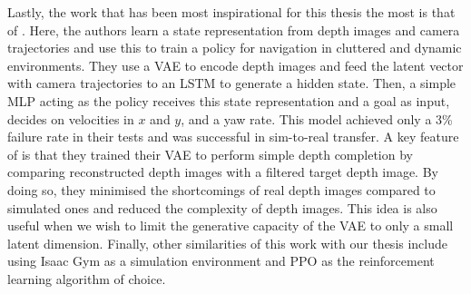 Lastly, the work that has been most inspirational for this thesis the most is that of \cite{LearningStateRepresentation}. Here, the authors learn a state representation from depth images and camera trajectories and use this to train a policy for navigation in cluttered and dynamic environments. They use a VAE to encode depth images and feed the latent vector with camera trajectories to an LSTM to generate a hidden state. Then, a simple MLP acting as the policy receives this state representation and a goal as input, decides on velocities in $x$ and $y$, and a yaw rate. This model achieved only a 3\% failure rate in their tests and was successful in sim-to-real transfer.
A key feature of \cite{LearningStateRepresentation} is that they trained their VAE to perform simple depth completion by comparing reconstructed depth images with a filtered target depth image. By doing so, they minimised the shortcomings of real depth images compared to simulated ones and reduced the complexity of depth images. This idea is also useful when we wish to limit the generative capacity of the VAE to only a small latent dimension.
Finally, other similarities of this work with our thesis include using Isaac Gym as a simulation environment and PPO as the reinforcement learning algorithm of choice. 

